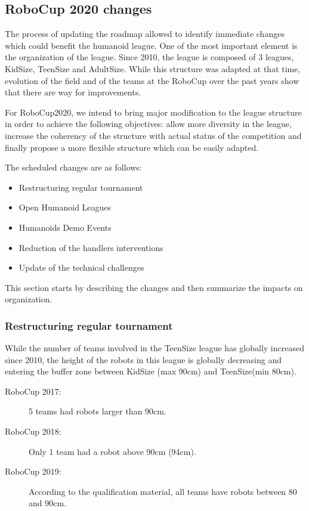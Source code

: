 \documentclass{article}
\begin{document}
\subsection{RoboCup 2020 changes}

The process of updating the roadmap allowed to identify immediate changes which
could benefit the humanoid league.
One of the most important element is the organization of the league. Since 2010,
the league is composed of 3 leagues, KidSize, TeenSize and AdultSize.
While this structure was adapted at that time, evolution of the field and of the
teams at the RoboCup over the past years show that there are way for improvements.

For RoboCup2020, we intend to bring major modification to the league structure
in order to achieve the following objectives:
allow more diversity in the league,
increase the coherency of the structure with actual status of the competition
and finally propose a more flexible structure which can be easily adapted.

The scheduled changes are as follows:
\begin{itemize}
\item Restructuring regular tournament
\item Open Humanoid Leagues
\item Humanoids Demo Events
\item Reduction of the handlers interventions
\item Update of the technical challenges
\end{itemize}

This section starts by describing the changes and then summarize the impacts on
organization.


\subsubsection{Restructuring regular tournament}

While the number of teams involved in the TeenSize league has globally increased
since 2010, the height of the robots in this league is globally decreasing and
entering the buffer zone between KidSize (max 90cm) and TeenSize(min 80cm).
\begin{description}
\item[RoboCup 2017:] 5 teams had robots larger than 90cm.
\item[RoboCup 2018:] Only 1 team had a robot above 90cm (94cm).
\item[RoboCup 2019:] According to the qualification material, all teams have
  robots between 80 and 90cm.
\end{description}
\end{document}
